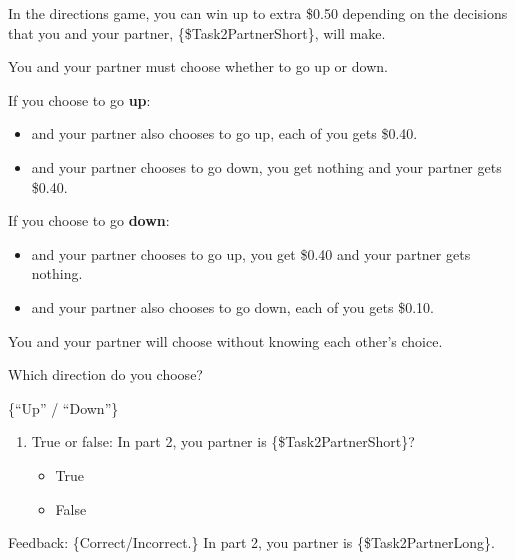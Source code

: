 \begin{description}[listparindent = 1.5em]
    \item[Directions game:] \hspace{1cm} 
    
    In the directions game, you can win up to extra \$0.50 depending on the
    decisions that you and your partner, \{\$Task2PartnerShort\}, will make. 
    
    You and
    your partner must choose whether to go up or down. 
    
    If you choose to go \textbf{up}:
    
    \begin{itemize}
    	\item and your partner also chooses to go up, each of you gets \$0.40.
    	\item and your partner chooses to go down, you get nothing and your
    partner gets \$0.40.
    \end{itemize}

    If you choose to go \textbf{down}:
    
    \begin{itemize}
    	\item and your partner chooses to go up, you get \$0.40 and your partner
    gets nothing.
    	\item and your partner also chooses to go down, each of you gets \$0.10.
    \end{itemize}

    You and your partner will choose without knowing each other's choice.

    Which direction do you choose? 
    
    \{``Up'' / ``Down''\}

    \item[Part 2 Quiz Question 1] \hspace{1cm}
    \begin{enumerate}
        \item True or false: In part 2, you partner is
        \{\$Task2PartnerShort\}?
        \begin{itemize}
            \item True
            \item False
        \end{itemize}
    \end{enumerate}

    Feedback: \{Correct/Incorrect.\} In part 2, you partner is
    \{\$Task2PartnerLong\}.


\end{description}
